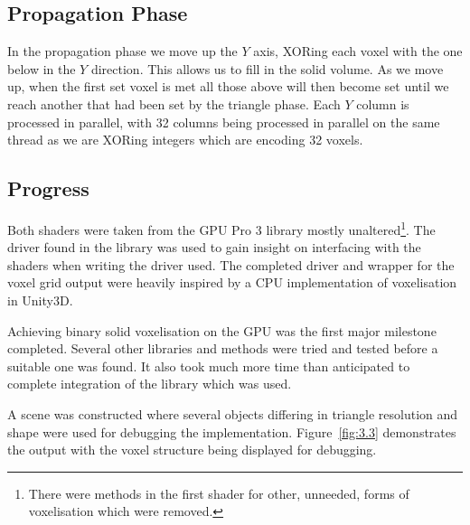 \subsection{Propagation Phase}

In the propagation phase we move up the $Y$ axis, XORing each voxel with the one below in the $Y$ direction. This allows us to fill in the solid volume. As we move up, when the first set voxel is met all those above will then become set until we reach another that had been set by the triangle phase. Each $Y$ column is processed in parallel, with 32 columns being processed in parallel on the same thread as we are XORing integers which are encoding 32 voxels.

\subsection{Progress}

\label{sect:voxprog}

Both shaders were taken from the GPU Pro 3 library mostly unaltered\footnote{There were methods in the first shader for other, unneeded, forms of voxelisation which were removed.}. The {} driver found in the library was used to gain insight on interfacing with the shaders when writing the {} driver used. The completed driver and wrapper for the voxel grid output were heavily inspired by a {} CPU implementation of voxelisation in Unity3D\cite{CPUVoxel}.

Achieving binary solid voxelisation on the GPU was the first major milestone completed. Several other libraries and methods were tried and tested before a suitable one was found. It also took much more time than anticipated to complete integration of the library which was used.

A scene was constructed where several objects differing in triangle resolution and shape were used for debugging the implementation. Figure~\ref{fig:3.3} demonstrates the output with the voxel structure being displayed for debugging.

